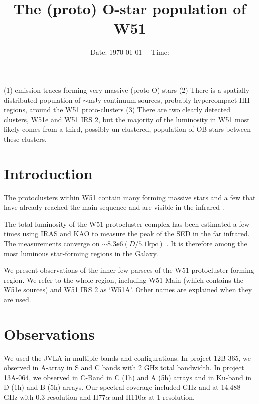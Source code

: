 



\title{The (proto) O-star population of W51}


\date{Date: \today ~~ Time: \currenttime}

\abstract
{}
{}
{}
{}
{
(1) \ortho \twotwo emission traces forming very massive (proto-O) stars
(2) There is a spatially distributed population of $\sim$mJy continuum sources,
probably hypercompact HII regions, around the W51 proto-clusters
(3) There are two clearly detected clusters, W51e and W51 IRS 2, but the
majority of the luminosity in W51 most likely comes from a third, possibly
un-clustered, population of OB stars between these clusters.
}

\maketitle


\section{Introduction}

The protoclusters within W51 contain many forming massive stars
\citep{Zhang1997a,Keto2008b,Zapata2008a,Zapata2009a,Zapata2010a,Goddi2015a,Shi2010a,Shi2010b}
and a few that have already reached the main sequence and are visible in the
infrared \citep{Barbosa2008a,Figueredo2008a}.

The total luminosity of the W51 protocluster complex has been estimated a few
times using IRAS and KAO to measure the peak of the SED in the far infrared.
The measurements converge on $\sim8.3\ee{6} (D/5.1\mathrm{kpc})$ \lsun
\citep{Harvey1986a,Sievers1991a}.  It is therefore among the most luminous
star-forming regions in the Galaxy.

We present observations of the inner few parsecs of the W51 protocluster
forming region.  We refer to the whole region, including W51 Main (which
contains the W51e sources) and W51 IRS 2 as `W51A'.  Other names are explained
when they are used.

\section{Observations}
We used the JVLA in multiple bands and configurations.  In project 12B-365, we
observed in A-array in S and C bands with 2 GHz total bandwidth.  In project
13A-064, we observed in C-Band in C (1h) and A (5h) arrays and in Ku-band in D
(1h) and B (5h) arrays.  Our spectral coverage included \ortho {} GHz
and \twotwo at 14.488 GHz with 0.3 \kms resolution and H77$\alpha$ and H110$\alpha$
at 1 \kms resolution.

